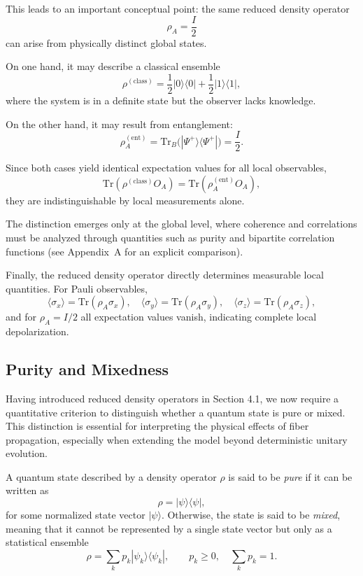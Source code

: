 \documentclass[a4paper]{article}
\begin{document}
This leads to an important conceptual point: the same reduced density operator
\[
\rho_A = \frac{I}{2}
\]
can arise from physically distinct global states.

On one hand, it may describe a classical ensemble
\[
\rho^{(\mathrm{class})}
=
\frac{1}{2}|0\rangle\langle 0|
+
\frac{1}{2}|1\rangle\langle 1|,
\]
where the system is in a definite state but the observer lacks knowledge.

On the other hand, it may result from entanglement:
\[
\rho_A^{(\mathrm{ent})}
=
\mathrm{Tr}_B\big(|\Psi^+\rangle\langle\Psi^+|\big)
=
\frac{I}{2}.
\]

Since both cases yield identical expectation values for all local observables,
\[
\mathrm{Tr}(\rho^{(\mathrm{class})} O_A)
=
\mathrm{Tr}(\rho_A^{(\mathrm{ent})} O_A),
\]
they are indistinguishable by local measurements alone.

The distinction emerges only at the global level, where coherence and correlations must be analyzed through quantities such as purity and bipartite correlation functions (see Appendix~A for an explicit comparison).

Finally, the reduced density operator directly determines measurable local quantities. For Pauli observables,
\[
\langle \sigma_x \rangle = \mathrm{Tr}(\rho_A \sigma_x), \quad
\langle \sigma_y \rangle = \mathrm{Tr}(\rho_A \sigma_y), \quad
\langle \sigma_z \rangle = \mathrm{Tr}(\rho_A \sigma_z),
\]
and for $\rho_A = I/2$ all expectation values vanish, indicating complete local depolarization.

\subsection{Purity and Mixedness}

Having introduced reduced density operators in Section 4.1, we now require a quantitative criterion to distinguish whether a quantum state is pure or mixed. This distinction is essential for interpreting the physical effects of fiber propagation, especially when extending the model beyond deterministic unitary evolution.

A quantum state described by a density operator $\rho$ is said to be \emph{pure} if it can be written as
\[
\rho = |\psi\rangle \langle \psi|,
\]
for some normalized state vector $|\psi\rangle$. Otherwise, the state is said to be \emph{mixed}, meaning that it cannot be represented by a single state vector but only as a statistical ensemble
\[
\rho = \sum_k p_k |\psi_k\rangle \langle \psi_k|, \qquad p_k \ge 0, \quad \sum_k p_k = 1.
\]
\end{document}
